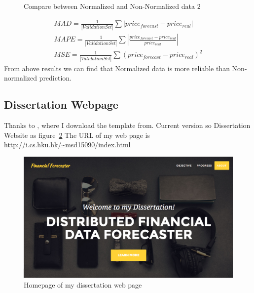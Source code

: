 \documentclass[12pt,a4paper]{scrartcl}
\begin{document}
	\begin{figure}[ht]
		\centering
		\caption{Compare between Normalized and Non-Normalized data 2}
		\label{fig:mse_mad}
	\end{figure}
	\begin{gather}
	\label{eq:MAD}
	MAD = \frac{1}{|ValidationSet|}\sum|price_{forecast}-price_{real}|\\
	\label{eq:MAPE}
	MAPE = \frac{1}{|ValidationSet|}\sum|\frac{price_{forecast}-price_{real}}{price_{real}}|\\
	\label{eq:MSE}
	MSE = \frac{1}{|ValidationSet|}\sum(price_{forecast}-price_{real})^2
	\end{gather}
	From above results we can find that Normalized data is more reliable than Non-normalized prediction.
	\subsection{Dissertation Webpage}
	Thanks to \cite{1_miller_2016}, where I download the template from. Current version so Dissertation Website as figure~\ref{fig:webpage} The URL of my web page is \url{http://i.cs.hku.hk/~msd15090/index.html}
	\begin{figure}[th]
		\centering
		\includegraphics[width=0.6\linewidth]{webpage}
		\caption{Homepage of my dissertation web page}
		\label{fig:webpage}
	\end{figure}
\end{document}
